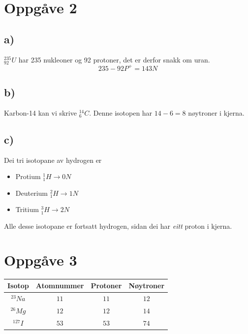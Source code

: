 \documentclass[12pt,a4paper]{article}
\begin{document}
  \section*{Oppgåve 2}
    \subsection*{a)}
    $^{235}_{92}U$ har 235 nukleoner og 92 protoner, det er derfor snakk om uran.
    \begin{equation}
      235 - 92 P^+ = 143 N
    \end{equation}


    \subsection*{b)}
    Karbon-14 kan vi skrive $^{14}_6 C$. Denne isotopen har $14-6= 8$ nøytroner i kjerna.


    \subsection*{c)}
    Dei tri isotopane av hydrogen er
    \begin{itemize}
      \item Protium $^1_1 H \rightarrow 0 N$
      \item Deuterium $^2_1 H \rightarrow 1N$
      \item Tritium $^3_1 H \rightarrow 2N$
    \end{itemize}
    Alle desse isotopane er fortsatt hydrogen, sidan dei har \textit{eitt} proton i kjerna.


  \section*{Oppgåve 3}
    \begin{center}
      \begin{tabular}{|c|c|c|c|}
        \hline
        Isotop & Atomnummer & Protoner & Nøytroner  \\
        \hline
        $^{23}Na$ & $11$ & $11$ & $12$ \\
        \hline
        $^{26}Mg$ & $12$ & $12$ & $14$ \\
        \hline
        $^{127}I$ & $53$ & $53$ & $74$ \\
        \hline
      \end{tabular}
    \end{center}
\end{document}
